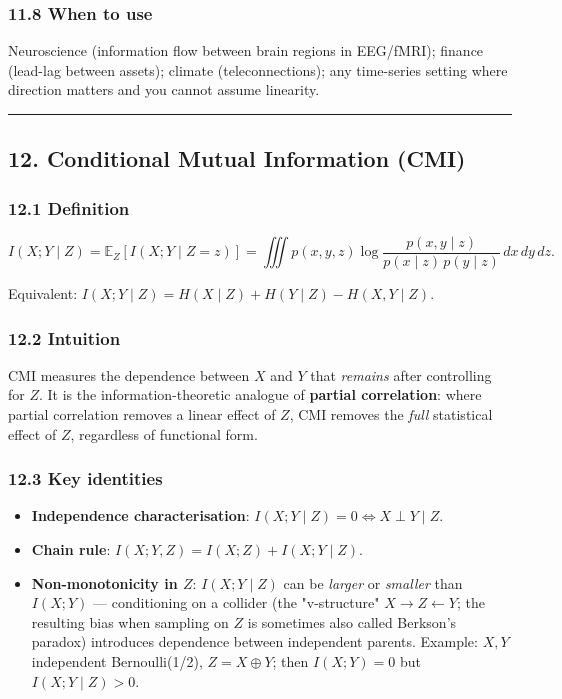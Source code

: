\documentclass{article}
\providecommand{\tightlist}{\setlength{\itemsep}{0pt}\setlength{\parskip}{0pt}}
\begin{document}
\subsubsection{11.8 When to use}\label{118-when-to-use}

Neuroscience (information flow between brain regions in EEG/fMRI);
finance (lead-lag between assets); climate (teleconnections); any
time-series setting where direction matters and you cannot assume
linearity.

\begin{center}\rule{0.5\linewidth}{0.5pt}\end{center}

\subsection{12. Conditional Mutual Information
(CMI)}\label{12-conditional-mutual-information-cmi}

\subsubsection{12.1 Definition}\label{121-definition}

\[
I(X; Y \mid Z) = \mathbb{E}_Z[I(X; Y \mid Z = z)] = \iiint p(x, y, z) \log \frac{p(x, y \mid z)}{p(x \mid z)\, p(y \mid z)} \, dx\, dy\, dz.
\]

Equivalent:
\(I(X; Y \mid Z) = H(X \mid Z) + H(Y \mid Z) - H(X, Y \mid Z)\).

\subsubsection{12.2 Intuition}\label{122-intuition}

CMI measures the dependence between \(X\) and \(Y\) that \emph{remains}
after controlling for \(Z\). It is the information-theoretic analogue of
\textbf{partial correlation}: where partial correlation removes a linear
effect of \(Z\), CMI removes the \emph{full} statistical effect of
\(Z\), regardless of functional form.

\subsubsection{12.3 Key identities}\label{123-key-identities}

\begin{itemize}
\tightlist
\item
  \textbf{Independence characterisation}:
  \(I(X; Y \mid Z) = 0 \iff X \perp Y \mid Z\).
\item
  \textbf{Chain rule}: \(I(X; Y, Z) = I(X; Z) + I(X; Y \mid Z)\).
\item
  \textbf{Non-monotonicity in \(Z\)}: \(I(X; Y \mid Z)\) can be
  \emph{larger} or \emph{smaller} than \(I(X; Y)\) --- conditioning
  on a collider (the "v-structure" \(X \to Z \leftarrow Y\); the
  resulting bias when sampling on \(Z\) is sometimes also called
  Berkson's paradox) introduces dependence between independent
  parents. Example: \(X, Y\) independent Bernoulli(1/2),
  \(Z = X \oplus Y\); then \(I(X; Y) = 0\) but \(I(X; Y \mid Z) > 0\).
\end{itemize}
\end{document}
